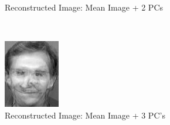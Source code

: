 \documentclass[12pt]{article}
\begin{document}
\begin{figure}
\begin{subfigure}[b]{0.20\textwidth}
		\caption{Reconstructed Image: Mean Image + 2 PCs}
	\end{subfigure}\\
	\begin{subfigure}[b]{0.20\textwidth}
		\includegraphics[width=\textwidth]{Task4.6_Images/ReconstructedImage3.jpg}
		\caption{Reconstructed Image: Mean Image + 3 PC's}
	\end{subfigure}\quad
	\begin{subfigure}[b]{0.20\textwidth}

\end{subfigure}
\end{figure}
\end{document}
